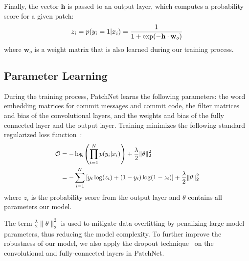 Finally, the vector $\mathbf{h}$ is passed to an output layer, which
computes a probability score for a given patch:
\begin{equation}  \footnotesize
z_i = p(y_i=1|x_i) = \frac{1}{1 + \exp({-\mathbf{h} \cdot \mathbf{w}_o)}}
\end{equation}
where $\mathbf{w}_o$ is a weight matrix 
that is also learned during our training process. 


\subsection{Parameter Learning}
\label{sec:learning}

During the training process, PatchNet learns the following parameters: the
word embedding matrices for commit messages and commit code, the filter matrices and bias of the convolutional layers, and the weights and bias of
the fully connected layer and the output layer. Training minimizes the
following standard regularized loss function~\cite{haykin2001kalman}:
\begin{equation} \footnotesize
\label{eq:cost}
\begin{split}
\mathcal{O} &= -\log\left( \prod_{i=1}^{N} p(y_i|x_i) \right) + \frac{\lambda}{2} \|\theta\|_{2}^{2} \\
 &= -\sum_{i=1}^{N} \left[ y_i \log (z_i) + (1 - y_i) \log(1 - z_i) \right] + \frac{\lambda}{2} \|\theta\|_{2}^{2}
\end{split}
\end{equation}
where $z_i$ is the probability score from the output layer and $\theta$
contains all parameters our model. 

The term $\frac{\lambda}{2} \|\theta\|_{2}^{2}$ is used to mitigate data overfitting by penalizing large model parameters, thus reducing the model complexity. 
To further improve the robustness of our model, we also apply the dropout technique~\cite{srivastava2014dropout} on the convolutional and fully-connected layers in PatchNet. 

